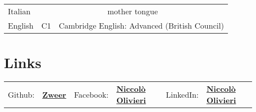\documentclass[letterpaper]{deedy-resume} %
\begin{document}
\begin{minipage}[t]{0.66\textwidth}
\begin{tabular}{lcl}
Italian & \multicolumn{2}{c}{mother tongue}\\
English & C1 & Cambridge English: Advanced (British Council)
\end{tabular}

\sectionspace %


\section{Links} 

\begin{tabular}{rlrlrl}
Github: & \href{https://github.com/Zweer}{\bf Zweer} &
Facebook: & \href{https://www.facebook.com/zweer}{\bf Niccolò Olivieri} &
LinkedIn: & \href{http://lnkd.in/b9ZrkZq}{\bf Niccolò Olivieri} \\
\end{tabular}





\end{minipage}
\end{document}
